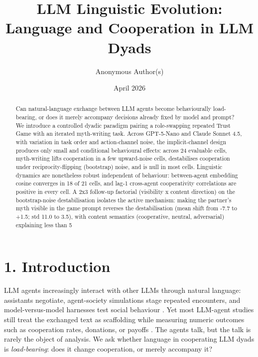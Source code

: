 \documentclass[10pt,letterpaper]{article}
\title{LLM Linguistic Evolution: Language and Cooperation in LLM Dyads}
\author{Anonymous Author(s)}
\date{April 2026}
\newcounter{none} %
\begin{document}
\maketitle
\begin{abstract}
Can natural-language exchange between LLM agents become behaviourally load-bearing, or does it merely accompany decisions already fixed by model and prompt? We introduce a controlled dyadic paradigm pairing a role-swapping repeated Trust Game with an iterated myth-writing task. Across GPT-5-Nano and Claude Sonnet 4.5, with variation in task order and action-channel noise, the implicit-channel design produces only small and conditional behavioural effects: across 24 evaluable cells, myth-writing lifts cooperation in a few upward-noise cells, destabilises cooperation under reciprocity-flipping (bootstrap) noise, and is null in most cells. Linguistic dynamics are nonetheless robust independent of behaviour: between-agent embedding cosine converges in 18 of 21 cells, and lag-1 cross-agent cooperativity correlations are positive in every cell. A 2x3 follow-up factorial (visibility x content direction) on the bootstrap-noise destabilisation isolates the active mechanism: making the partner's myth visible in the game prompt reverses the destabilisation (mean shift from -7.7 to +1.5; std 11.0 to 3.5), with content semantics (cooperative, neutral, adversarial) explaining less than 5%
\end{abstract}

\section{1. Introduction}\label{introduction}

LLM agents increasingly interact with other LLMs through natural
language: assistants negotiate, agent-society simulations stage repeated
encounters, and model-versus-model harnesses test social behaviour
\citep{park2023, zhou2024}. Yet most LLM-agent studies
still treat the exchanged text as scaffolding while measuring numeric
outcomes such as cooperation rates, donations, or payoffs \citep{akata2023, lore2024}. The agents talk, but the talk is
rarely the object of analysis. We ask whether language in cooperating
LLM dyads is \emph{load-bearing}: does it change cooperation, or merely
accompany it?
\end{document}

